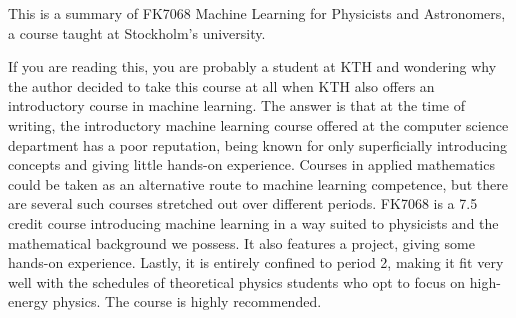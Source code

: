 This is a summary of FK7068 Machine Learning for Physicists and Astronomers, a course taught at Stockholm's university.

If you are reading this, you are probably a student at KTH and wondering why the author decided to take this course at all when KTH also offers an introductory course in machine learning. The answer is that at the time of writing, the introductory machine learning course offered at the computer science department has a poor reputation, being known for only superficially introducing concepts and giving little hands-on experience. Courses in applied mathematics could be taken as an alternative route to machine learning competence, but there are several such courses stretched out over different periods. FK7068 is a 7.5 credit course introducing machine learning in a way suited to physicists and the mathematical background we possess. It also features a project, giving some hands-on experience. Lastly, it is entirely confined to period 2, making it fit very well with the schedules of theoretical physics students who opt to focus on high-energy physics. The course is highly recommended.